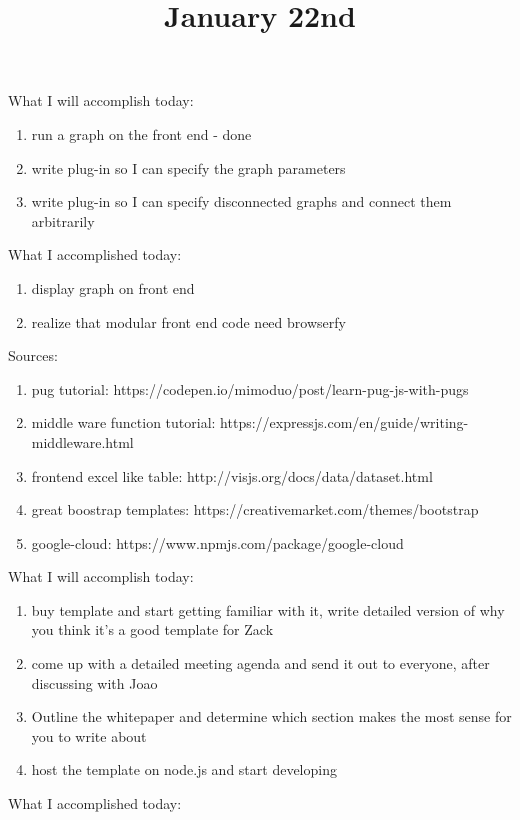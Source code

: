 What I will accomplish today:

\begin{enumerate}
	\item run a graph on the front end - done
	\item write plug-in so I can specify the graph parameters
	\item write plug-in so I can specify disconnected graphs and connect them arbitrarily
\end{enumerate}


What I accomplished today:

\begin{enumerate}
	\item display graph on front end
	\item realize that modular front end code need browserfy
\end{enumerate}

Sources:

\begin{enumerate}
	\item pug tutorial: https://codepen.io/mimoduo/post/learn-pug-js-with-pugs
	\item middle ware function tutorial: https://expressjs.com/en/guide/writing-middleware.html
	\item frontend excel like table: http://visjs.org/docs/data/dataset.html
	\item great boostrap templates: https://creativemarket.com/themes/bootstrap
	\item google-cloud: https://www.npmjs.com/package/google-cloud
\end{enumerate}

\title{January 22nd}

What I will accomplish today:

\begin{enumerate}
	\item buy template and start getting familiar with it, write detailed version of why you think it's a good template for Zack
	\item come up with a detailed meeting agenda and send it out to everyone, after discussing with Joao
	\item Outline the whitepaper and determine which section makes the most sense for you to write about
	\item host the template on node.js and start developing
\end{enumerate}


What I accomplished today:

